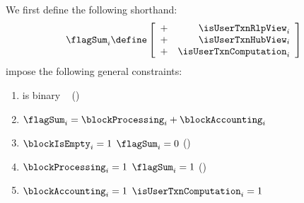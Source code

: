 We first define the following shorthand:
\[
	\flagSum _{i}
	\define
	\left[ \begin{array}{cr}
		+ & \isUserTxnRlpView     _{i} \\
		+ & \isUserTxnHubView     _{i} \\
		+ & \isUserTxnComputation _{i} \\
	\end{array} \right]
\]
impose the following general constraints:
\begin{enumerate}
	\item \flagSum{} is binary ~ (\sanityCheck)
	\item $\flagSum _{i} = \blockProcessing _{i} + \blockAccounting _{i}$
	\item \If $\blockIsEmpty    _{i} = 1$ \Then $\flagSum              _{i} = 0$ (\sanityCheck)
	\item \If $\blockProcessing _{i} = 1$ \Then $\flagSum              _{i} = 1$ (\sanityCheck)
	\item \If $\blockAccounting _{i} = 1$ \Then $\isUserTxnComputation _{i} = 1$
\end{enumerate}
